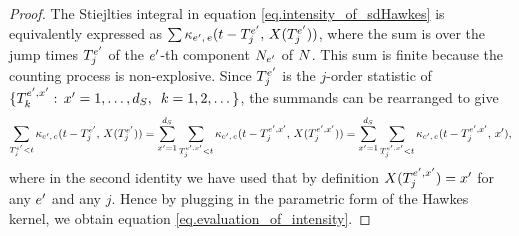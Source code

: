 \documentclass[10pt]{article}
\begin{document}
\begin{proof}
 The Stiejlties integral in equation \eqref{eq.intensity_of_sdHawkes} is equivalently expressed as $\sum \hawkesKernel\subscriptee (t-\arrivalTimes[\eone]_j, \, X(\arrivalTimes[\eone]_j) )$, where the sum is over the jump times $\arrivalTimes[\eone]_j$ of the $\eone$-th component $\countingProc[\eone]$ of $\multiCountingProc$. This sum is finite because the counting process is non-explosive. Since $\arrivalTimes[\eone]_j$ is the $j$-order statistic of $\lbrace \arrivalTimes[\eone,\xone]_k: \, \xone=1,\dots,\numStates, \,\,\, k=1,2,\dots\rbrace$, the summands can be rearranged to give 
 \begin{equation*}
  \sum_{\arrivalTimes[\eone]_j < t} \hawkesKernel\subscriptee (t-\arrivalTimes[\eone]_j, \, X(\arrivalTimes[\eone]_j))
  = \sum_{\xone=1}^{\numStates} \sum_{\arrivalTimes[\eone, \xone]_j < t} \hawkesKernel\subscriptee (t-\arrivalTimes[\eone, \xone]_j, \, X(\arrivalTimes[\eone,\xone]_j))
  = \sum_{\xone=1}^{\numStates} \sum_{\arrivalTimes[\eone, \xone]_j < t} \hawkesKernel\subscriptee (t-\arrivalTimes[\eone, \xone]_j, \, \xone),
 \end{equation*}
where in the second identity we have used that by definition $X(\arrivalTimes[\eone,\xone]_j) = \xone$ for any $\eone$ and any $j$. Hence by plugging in the parametric form of the Hawkes kernel, we obtain equation \eqref{eq.evaluation_of_intensity}. 


\end{proof}
\end{document}
